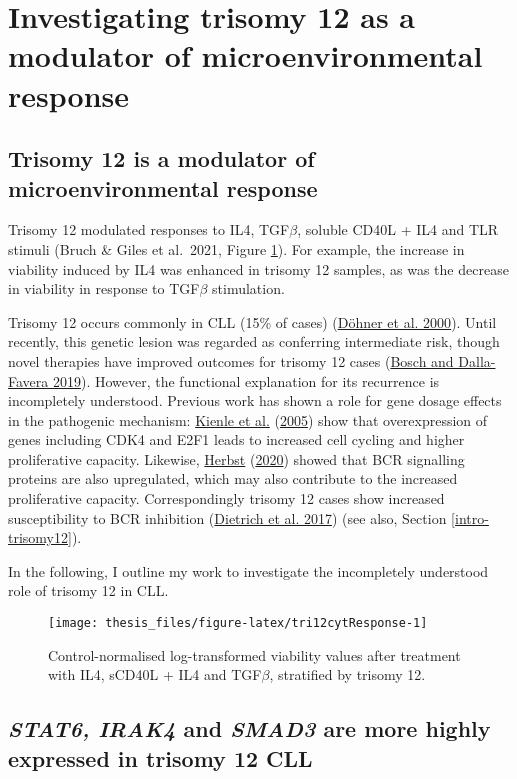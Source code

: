 \documentclass[11pt, a4paper, twosided]{book}
\begin{document}
\hypertarget{investigating-trisomy-12-as-a-modulator-of-microenvironmental-response}{%
\section{Investigating trisomy 12 as a modulator of microenvironmental response}\label{investigating-trisomy-12-as-a-modulator-of-microenvironmental-response}}

\hypertarget{trisomy12-modulator}{%
\subsection{Trisomy 12 is a modulator of microenvironmental response}\label{trisomy12-modulator}}

Trisomy 12 modulated responses to IL4, TGF\(\beta\), soluble CD40L + IL4 and TLR stimuli (Bruch \& Giles et al.~2021, Figure \ref{fig:tri12cytResponse}). For example, the increase in viability induced by IL4 was enhanced in trisomy 12 samples, as was the decrease in viability in response to TGF\(\beta\) stimulation.

Trisomy 12 occurs commonly in CLL (15\% of cases) (\protect\hyperlink{ref-Dohner2000}{Döhner et al. 2000}). Until recently, this genetic lesion was regarded as conferring intermediate risk, though novel therapies have improved outcomes for trisomy 12 cases (\protect\hyperlink{ref-Bosch2019}{Bosch and Dalla-Favera 2019}). However, the functional explanation for its recurrence is incompletely understood. Previous work has shown a role for gene dosage effects in the pathogenic mechanism: \protect\hyperlink{ref-Kienle2005}{Kienle et al.} (\protect\hyperlink{ref-Kienle2005}{2005}) show that overexpression of genes including CDK4 and E2F1 leads to increased cell cycling and higher proliferative capacity. Likewise, \protect\hyperlink{ref-HerbstThesis}{Herbst} (\protect\hyperlink{ref-HerbstThesis}{2020}) showed that BCR signalling proteins are also upregulated, which may also contribute to the increased proliferative capacity. Correspondingly trisomy 12 cases show increased susceptibility to BCR inhibition (\protect\hyperlink{ref-JCIpaper}{Dietrich et al. 2017}) (see also, Section \ref{intro-trisomy12}).

In the following, I outline my work to investigate the incompletely understood role of trisomy 12 in CLL.


\begin{figure}

{\centering \texttt{[image: thesis\_files/figure-latex/tri12cytResponse-1]} 

}

\caption{Control-normalised log-transformed viability values after treatment with IL4, sCD40L + IL4 and TGF\(\beta\), stratified by trisomy 12.}\label{fig:tri12cytResponse}
\end{figure}
\hypertarget{gene-dosage-effects}{%
\subsection{\texorpdfstring{\emph{STAT6, IRAK4} and \emph{SMAD3} are more highly expressed in trisomy 12 CLL}{STAT6, IRAK4 and SMAD3 are more highly expressed in trisomy 12 CLL}}\label{gene-dosage-effects}}
\end{document}
